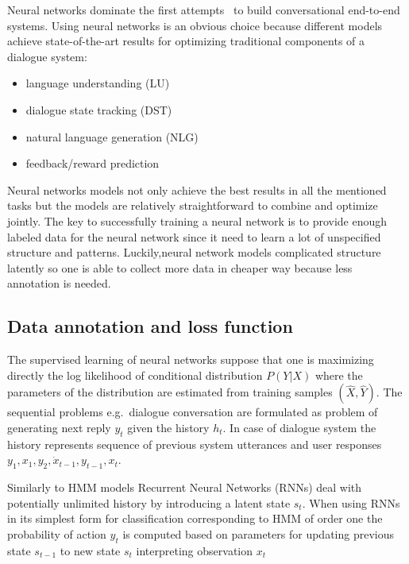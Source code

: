 \documentclass[11pt]{article}
\begin{document}
Neural networks dominate the first attempts~\cite{williams2016end,bordes_learning_2016,weston2015endtoend_prereq} to build conversational end-to-end systems.
Using neural networks is an obvious choice because different models achieve state-of-the-art results for optimizing traditional components of a dialogue system:
\begin{itemize}
    \item language understanding (LU) \cite{mairesse_spoken_2009} 
    \item dialogue state tracking (DST) \cite{williams_web-style_2014,henderson2014word,vodolan_hybrid_2015,platek_recurrent_2016}
    \item natural language generation (NLG) \cite{dusek_sequence2sequence_2016,wen_networkbased_2016}
    \item feedback/reward prediction~\cite{su_learning_2015}
\end{itemize}
Neural networks models not only achieve the best results in all the mentioned tasks but the models are relatively straightforward to combine and optimize jointly.
The key to successfully training a neural network is to provide enough labeled data for the neural network since it need to learn a lot of unspecified structure and patterns.
Luckily,neural network models complicated structure latently so one is able to collect more data in cheaper way because less annotation is needed.

\subsection{Data annotation and loss function}
\label{sub:data_annotation}

The supervised learning of neural networks suppose that one is maximizing directly the log likelihood of conditional distribution $ P(Y| X) $ where the parameters of the distribution are estimated from training samples $ (\hat{X}, \hat{Y}) $.
The sequential problems e.g.\ dialogue conversation are formulated as problem of generating next reply $y_t$ given the history $h_t$.
In case of dialogue system the history represents sequence of previous system utterances and user responses $ y_1, x_1, y_2, \dot x_{t-1}, y_{t-1}, x_t $.

Similarly to HMM models Recurrent Neural Networks (RNNs) deal with potentially unlimited history by introducing a latent state $ s_t$.
When using RNNs~\cite{gers_learning_2000} in its simplest form for classification corresponding to HMM of order one the probability of action $ y_t $ is computed based on parameters for updating previous state $s_{t-1}$ to new state $s_t$ interpreting observation $x_t$ 
\end{document}
